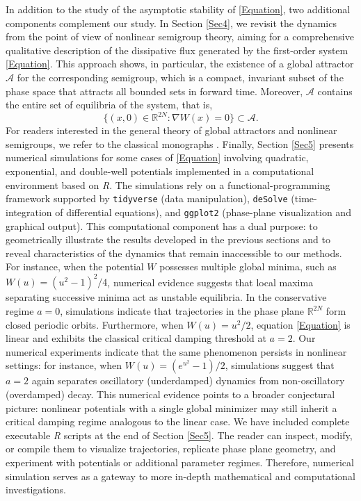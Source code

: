 \documentclass[12pt]{amsart}
\numberwithin{equation}{section}
\begin{document}
In addition to the study of the asymptotic stability of \eqref{Equation}, two additional components complement our study. In Section \ref{Sec4}, we revisit the dynamics from the point of view of nonlinear semigroup theory, aiming for a comprehensive qualitative description of the dissipative flux generated by the first-order system \eqref{Equation}. This approach shows, in particular, the existence of a global attractor $\mathcal{A}$ for the corresponding semigroup, which is a compact, invariant subset of the phase space that attracts all bounded sets in forward time. Moreover, $\mathcal{A}$ contains the entire set of equilibria of the system, that is, 
$$\{(x,0)\in\mathbb{R}^{2N}:\nabla W (x)=0\}\subset \mathcal{A}.
$$ 
For readers interested in the general theory of global attractors and nonlinear semigroups, we refer to the classical monographs \cite{Livro-Alexandre,Hale,Temam}. Finally, Section \ref{Sec5} presents numerical simulations for some cases of \eqref{Equation} involving quadratic, exponential, and double-well potentials implemented in a computational environment based on \emph{R}. The simulations rely on a functional-programming framework supported by \texttt{tidyverse} (data manipulation), \texttt{deSolve} (time-integration of differential equations), and \texttt{ggplot2} (phase-plane visualization and graphical output). This computational component has a dual purpose: to geometrically illustrate the results developed in the previous sections and to reveal characteristics of the dynamics that remain inaccessible to our methods. For instance, when the potential $W$ possesses multiple global minima, such as $W(u)=(u^2-1)^2/4$, numerical evidence suggests that local maxima separating successive minima act as unstable equilibria. In the conservative regime $a=0$, simulations indicate that trajectories in the phase plane $\mathbb{R}^{2N}$ form closed periodic orbits. Furthermore, when $W(u)=u^2/2$, equation \eqref{Equation} is linear and exhibits the classical critical damping threshold at $a=2$. Our numerical experiments indicate that the same phenomenon persists in nonlinear settings: for instance, when $W(u)=(e^{u^{2}}-1)/2$, simulations suggest that $a=2$ again separates oscillatory (underdamped) dynamics from non-oscillatory (overdamped) decay. This numerical evidence points to a broader conjectural picture: nonlinear potentials with a single global minimizer may still inherit a critical damping regime analogous to the linear case. We have included complete executable \emph{R} scripts at the end of Section \ref{Sec5}. The reader can inspect, modify, or compile them to visualize trajectories, replicate phase plane geometry, and experiment with potentials or additional parameter regimes. Therefore, numerical simulation serves as a gateway to more in-depth mathematical and computational investigations.
\end{document}

